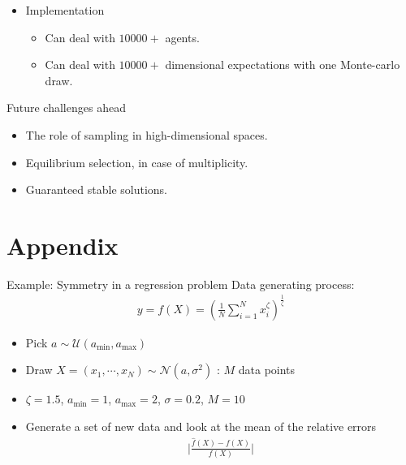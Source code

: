 \documentclass[aspectratio=169,10pt]{beamer}
\begin{document}
\begin{frame}
\begin{itemize}
				\item Implementation\vspace{0.1in}
				\begin{itemize}
					\item Can deal with $10000+$ agents.\vspace{0.1in}
					\smallskip
					\item Can deal with $10000+$ dimensional expectations with one Monte-carlo draw.\vspace{0.1in}
					\smallskip
				\end{itemize}
			\end{itemize}
			\end{frame}

\begin{frame}{Future challenges ahead}
	\begin{itemize}
		\item The role of sampling in high-dimensional spaces. 
		\smallskip
		\item Equilibrium selection, in case of  multiplicity.
		\smallskip 
		\item Guaranteed stable solutions.
	\end{itemize}
\end{frame}

\section{Appendix}


\begin{frame}[label = Reg-example]{Example: Symmetry in a regression problem}
Data generating process:
\begin{align*}
	y = f(X) = \left(\frac{1}{N}\sum_{i=1}^N x_i^{\zeta}\right)^{\frac{1}{\zeta}}
\end{align*}	
\begin{itemize}
	\item Pick  $a\sim \mathcal{U}(a_{\text{min}},a_{\text{max}})$
	\item Draw $X = (x_1,\cdots,x_N) \sim \mathcal{N}(a,\sigma^2)$ : $M$ data points
	\item $\zeta = 1.5$, $a_{\text{min}} = 1$, $a_{\text{max}} = 2$, $\sigma = 0.2$, $M = 10 $
	\item Generate a set of new data and look at the mean of the relative errors
	\begin{align*}
		\big|\frac{\hat{f}(X)-f(X)}{f(X)}\big|
	\end{align*}
\end{itemize}
\end{frame}
\end{document}
